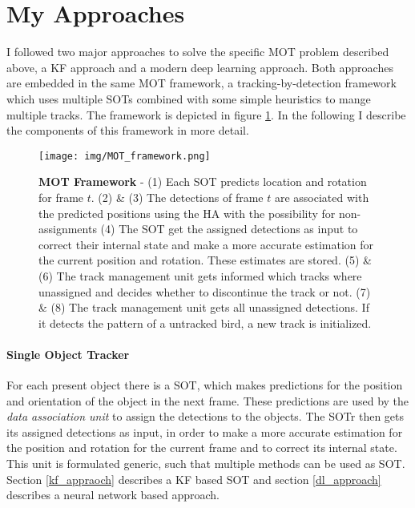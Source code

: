 \documentclass[12pt,a4paper]{article}
\begin{document}
\section{My Approaches}
\label{approaches}
I followed two major approaches to solve the specific MOT problem described above, a KF approach and a modern deep learning approach. Both approaches are embedded in the same MOT framework, a tracking-by-detection framework which uses multiple SOTs combined with some simple heuristics to mange multiple tracks. The framework is depicted in figure \ref{flow_chart}. In the following I describe the components of this framework in more detail.


\begin{figure}[!htbp]
	\begin{center}
		\texttt{[image: img/MOT\_framework.png]}
		\caption{ \textbf{MOT Framework} - 
			(1) Each SOT predicts location and rotation for frame $t$. (2) \& (3) The detections of frame $t$ are associated with the predicted positions using the HA with the possibility for non-assignments (4) The SOT get the assigned detections as input to correct their internal state and make a more accurate estimation for the current position and rotation. These estimates are stored. (5) \& (6) The track management unit gets informed which tracks where unassigned and decides whether to discontinue the track or not. (7) \& (8) The track management unit gets all unassigned detections. If it detects the pattern of a untracked bird, a new track is initialized. }
		\label{flow_chart}
	\end{center}
\end{figure}

\paragraph{Single Object Tracker} 
For each present object there is a SOT, which makes predictions for the position and orientation of the object in the next frame. These predictions are used by the \emph{data association unit} to assign the detections to the objects. The SOTr then gets its assigned detections as input, in order to make a more accurate estimation for the position and rotation for the current frame and to correct its internal state.\\
This unit is formulated generic, such that multiple methods can be used as SOT. Section \ref{kf_appraoch} describes a KF based SOT and section \ref{dl_approach} describes a neural network based approach.
\end{document}
